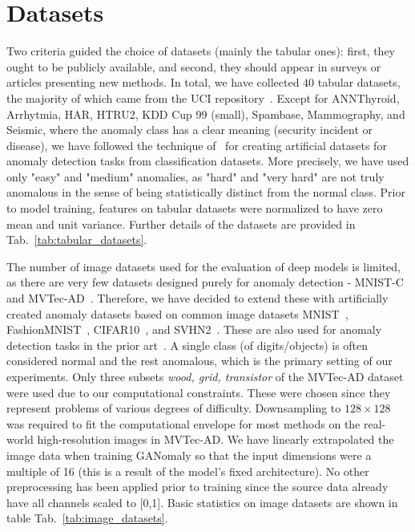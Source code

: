 \chapter{Datasets}\label{sec:datasets}
Two criteria guided the choice of datasets (mainly the tabular ones): first, they ought to be publicly available, and second, they should appear in surveys or articles presenting new methods.  In total, we have collected $40$ tabular datasets, the majority of which came from the UCI repository~\cite{Dua:2019}. Except for ANNThyroid, Arrhytmia, HAR, HTRU2, KDD Cup 99 (small), Spambase, Mammography, and Seismic, where the anomaly class has a clear meaning (security incident or disease), we have followed the technique of~\cite{emmott2013systematic} for creating artificial datasets for anomaly detection tasks from classification datasets. More precisely, we have used only "easy" and "medium" anomalies, as "hard" and "very hard" are not truly anomalous in the sense of being statistically distinct from the normal class. Prior to model training, features on tabular datasets were normalized to have zero mean and unit variance. Further details of the datasets are provided in Tab.~\ref{tab:tabular_datasets}.

The number of image datasets used for the evaluation of deep models is limited, as there are very few datasets designed purely for anomaly detection - MNIST-C~\cite{muMNISTCRobustnessBenchmark2019} and MVTec-AD~\cite{bergmann2019mvtec}. Therefore, we have decided to extend these with artificially created anomaly datasets based on common image datasets MNIST~\cite{lecun2010mnist}, FashionMNIST~\cite{xiao2017fashion}, CIFAR10~\cite{krizhevsky2009learning}, and SVHN2~\cite{netzer2011reading}. These are also used for anomaly detection tasks in the prior art~\cite{perera2019ocgan, pidhorskyi2018generative, ruff2018deep}. A single class (of digits/objects) is often considered normal and the rest anomalous, which is the primary setting of our experiments. Only three subsets \textit{wood, grid, transistor} of the MVTec-AD dataset were used due to our computational constraints. These were chosen since they represent problems of various degrees of difficulty. Downsampling to $128 \times 128$ was required to fit the computational envelope for most methods on the real-world high-resolution images in MVTec-AD.  We have linearly extrapolated the image data when training GANomaly so that the input dimensions were a multiple of 16 (this is a result of the model's fixed architecture). No other preprocessing has been applied prior to training since the source data already have all channels scaled to [0,1].  Basic statistics on image datasets are shown in table Tab.~\ref{tab:image_datasets}. 

